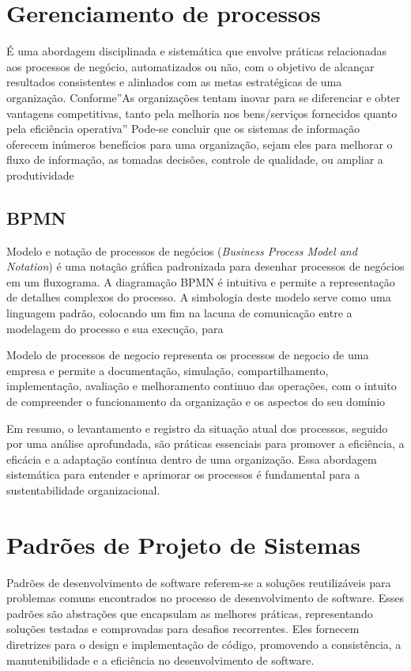 \section{Gerenciamento de processos}
É uma abordagem disciplinada e sistemática que envolve práticas relacionadas aos processos de negócio, automatizados ou não, com o objetivo de alcançar resultados consistentes e alinhados com as metas estratégicas de uma organização. 
Conforme\cite{davila2008inovaccao}''As organizações tentam inovar para se diferenciar e obter vantagens competitivas, tanto pela melhoria nos bens/serviços fornecidos quanto pela eficiência operativa''
Pode-se concluir que os sistemas de informação oferecem inúmeros benefícios para uma organização, sejam eles para melhorar o fluxo de informação, as tomadas decisões, controle de qualidade, ou ampliar a produtividade
\subsection{BPMN}
Modelo e notação de processos de negócios (\textit{Business Process Model and Notation}) é uma notação gráfica padronizada para desenhar processos de negócios em um fluxograma. A diagramação BPMN é intuitiva e permite a representação de detalhes complexos do processo. A simbologia deste modelo serve como uma linguagem padrão, colocando um fim na lacuna de comunicação entre a modelagem do processo e sua execução, para 
\begin{citacao}
	\cite{bitencourt2016elicitaccao} 
	Modelo de processos de negocio representa os processos de negocio de uma empresa e permite a documentação, simulação, compartilhamento, implementação, avaliação e melhoramento continuo das operações, com o intuito de compreender o funcionamento da organização e os aspectos do seu domínio
	
\end{citacao}
Em resumo, o levantamento e registro da situação atual dos processos, seguido por uma análise aprofundada, são práticas essenciais para promover a eficiência, a eficácia e a adaptação contínua dentro de uma organização. Essa abordagem sistemática para entender e aprimorar os processos é fundamental para a sustentabilidade organizacional.

\section{Padrões de Projeto de Sistemas}
Padrões de desenvolvimento de software referem-se a soluções reutilizáveis para problemas comuns encontrados no processo de desenvolvimento de software. Esses padrões são abstrações que encapsulam as melhores práticas, representando soluções testadas e comprovadas para desafios recorrentes. Eles fornecem diretrizes para o design e implementação de código, promovendo a consistência, a manutenibilidade e a eficiência no desenvolvimento de software.\cite{padroesProjeto}

